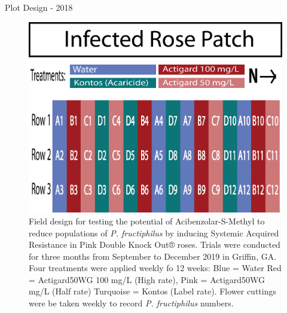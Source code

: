 \documentclass[
  ignorenonframetext,
]{beamer}
\begin{document}
\begin{frame}
\begin{block}{Plot Design - 2018}
\protect\hypertarget{plot-design---2018}{}
\begin{figure}
\includegraphics[width=0.8\linewidth]{figure/rrv_asm_plot_2018_griffin} \caption{Field design for testing the potential of Acibenzolar-S-Methyl to reduce populations of \textit{P. fructiphilus} by inducing Systemic Acquired Resistance in Pink Double Knock Out® roses. Trials were conducted for three months from September to December 2019 in Griffin, GA. Four treatments were applied weekly fo 12 weeks: Blue = Water Red = Actigard50WG 100 \si{\milli\gram}/L (High rate),  Pink = Actigard50WG \si{\milli\gram}/L (Half rate) Turquoise = Kontos (Label rate). Flower cuttings were be taken weekly to record \textit{P. fructiphilus} numbers.}\label{fig:unnamed-chunk-1}
\end{figure}
\end{block}


\end{frame}
\end{document}
